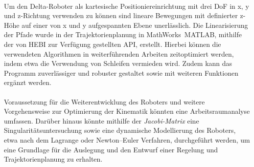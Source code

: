 \documentclass[Bachelor, BMR, ngerman]{twbook}
\begin{document}
    \\
    Um den Delta-Roboter als kartesische Positioniereinrichtung mit drei DoF in x, y und z-Richtung verwenden zu können sind lineare Bewegungen mit definierter z-Höhe auf einer von x und y aufgespannten Ebene unerlässlich. Die Linearisierung der Pfade wurde in der Trajektorienplanung in MathWorks\textregistered\ MATLAB, mithilfe der von HEBI zur Verfügung gestellten API, erstellt. Hierbei können die verwendeten Algorithmen in weiterführenden Arbeiten zeitoptimiert werden, indem etwa die Verwendung von Schleifen vermieden wird. Zudem kann das Programm zuverlässiger und robuster gestaltet sowie mit weiteren Funktionen ergänzt werden.\\
    \\
    Voraussetzung für die Weiterentwicklung des Roboters und weitere Vorgehensweise zur Optimierung der Kinematik könnten eine Arbeitsraumanalyse umfassen. Darüber hinaus könnte mithilfe der \textit{Jacobi-Matrix} eine Singularitätsuntersuchung sowie eine dynamische Modellierung des Roboters, etwa nach dem Lagrange oder Newton–Euler Verfahren, durchgeführt werden, um eine Grundlage für die Auslegung und den Entwurf einer Regelung und Trajektorienplanung zu erhalten. 
\end{document}
